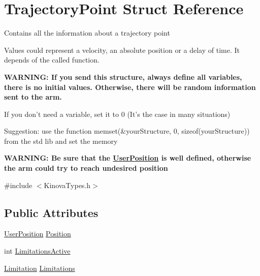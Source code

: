 \hypertarget{struct_trajectory_point}{\section{Trajectory\-Point Struct Reference}
\label{struct_trajectory_point}
}


\par
Contains all the information about a trajectory point \par
Values could represent a velocity, an absolute position or a delay of time. It depends of the called function. \par
{\bfseries W\-A\-R\-N\-I\-N\-G\-: If you send this structure, always define all variables, there is no initial values. Otherwise, there will be random information sent to the arm.} \par
If you don't need a variable, set it to 0 (It's the case in many situations) \par
Suggestion\-: use the function memset(\&your\-Structure, 0, sizeof(your\-Structure)) from the std lib and set the memory \par
{\bfseries W\-A\-R\-N\-I\-N\-G\-: Be sure that the \hyperlink{struct_user_position}{User\-Position} is well defined, otherwise the arm could try to reach undesired position}  




{\ttfamily \#include $<$Kinova\-Types.\-h$>$}

\subsection*{Public Attributes}
\begin{DoxyCompactItemize}
\item 
\hyperlink{struct_user_position}{User\-Position} \hyperlink{struct_trajectory_point_aa24430dc273e9d7968a6c44e3bcee259}{Position}
\item 
int \hyperlink{struct_trajectory_point_acec47b76503d6f202e78bd00ec8fa02d}{Limitations\-Active}
\item 
\hyperlink{struct_limitation}{Limitation} \hyperlink{struct_trajectory_point_ad6d7f13b1dee1ef3a5300ffffd77cac8}{Limitations}
\end{DoxyCompactItemize}



